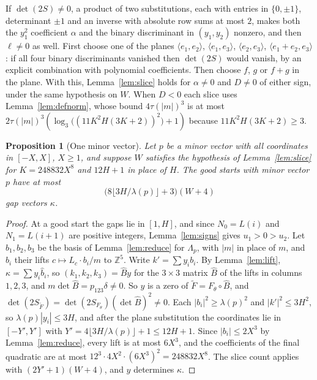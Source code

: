 \documentclass[11pt]{amsart}
\newtheorem{proposition}[theorem]{Proposition}
\theoremstyle{definition}
\theoremstyle{remark}
\begin{document}
If $\det(2S)\ne0$, a product of two substitutions, each with entries in $\{0,\pm1\}$,
determinant $\pm1$ and an inverse with absolute row sums at most $2$, makes both the $y_1^2$
coefficient $\alpha$ and the binary discriminant in $(y_1,y_2)$ nonzero, and then $\ell\ne0$ as
well. First choose one of the planes
$\langle e_1,e_2\rangle$, $\langle e_1,e_3\rangle$, $\langle e_2,e_3\rangle$,
$\langle e_1+e_2,e_3\rangle$: if all four binary discriminants vanished then $\det(2S)$ would
vanish, by an explicit combination with polynomial coefficients. Then choose $f$, $g$ or $f+g$ in the plane. With this, Lemma~\ref{lem:slice} holds
for $\alpha\ne0$ and $D\ne0$ of either sign, under the same hypothesis on $W$. When
$D<0$ each slice uses Lemma~\ref{lem:defnorm}, whose bound $4\tau(|m|)^3$ is at most
$2\tau(|m|)^3(\log_3\bigl((11K^2H(3K+2))^2\bigr)+1)$ because $11K^2H(3K+2)\ge3$.

\begin{proposition}[One minor vector]\label{prop:fibre}
Let $p$ be a minor vector with all coordinates in $[-X,X]$, $X\ge1$, and suppose $W$ satisfies
the hypothesis of Lemma~\ref{lem:slice} for $K=248832X^8$ and $12H+1$ in place of $H$. The good
starts with minor vector $p$ have at most
\[
\bigl(8\lfloor3H/\lambda(p)\rfloor+3\bigr)(W+4)
\]
gap vectors $\kappa$.
\end{proposition}

\begin{proof}
At a good start the gaps lie in $[1,H]$, and since $N_0=L(i)$ and $N_1=L(i+1)$ are positive
integers, Lemma~\ref{lem:signs} gives $u_1>0>u_2$. Let $b_1,b_2,b_3$ be the basis of Lemma~\ref{lem:reduce} for $\Lambda_p$, with $|m|$ in
place of $m$, and $\hat b_i$ their lifts $c\mapsto L_c\cdot b_i/m$ to $\mathbb Z^5$. Write
$k'=\sum y_ib_i$. By Lemma~\ref{lem:lift}, $\kappa=\sum y_i\hat b_i$, so $(k_1,k_2,k_3)=\hat By$
for the $3\times3$ matrix $\hat B$ of the lifts in columns $1,2,3$, and
$m\det\hat B=p_{123}\delta\ne0$. So $y$ is a zero of $\tilde F=F_\theta\circ\hat B$, and
$\det(2S_{\tilde F})=\det(2S_{F_\theta})(\det\hat B)^2\ne0$. Each $|b_i|^2\ge\lambda(p)^2$ and
$|k'|^2\le3H^2$, so $\lambda(p)|y_i|\le3H$, and after the plane substitution the coordinates lie
in $[-Y',Y']$ with $Y'=4\lfloor3H/\lambda(p)\rfloor+1\le12H+1$. Since $|b_i|\le2X^3$ by
Lemma~\ref{lem:reduce}, every lift is at most $6X^3$, and the coefficients of the final quadratic
are at most $12^3\cdot4X^2\cdot(6X^3)^2=248832X^8$. The slice count applies with
$(2Y'+1)(W+4)$, and $y$ determines $\kappa$.
\end{proof}
\end{document}
